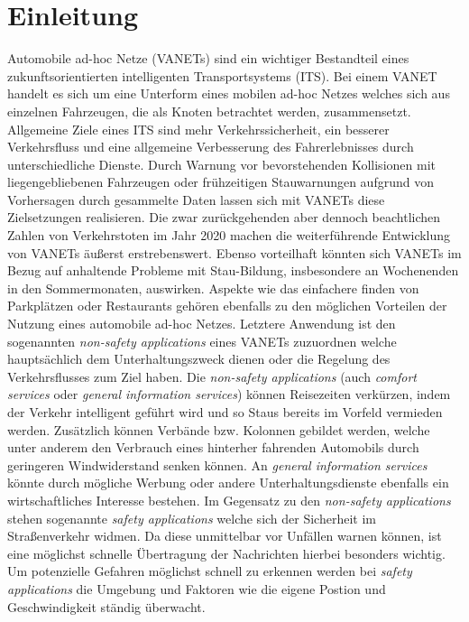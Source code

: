 \documentclass[english,runningheads,a4paper]{llncs}[2018/03/10]
\begin{document}
\section{Einleitung}\label{sec:intro}
Automobile ad-hoc Netze (VANETs) sind ein wichtiger Bestandteil eines zukunftsorientierten intelligenten Transportsystems (ITS). %
Bei einem VANET handelt es sich um eine Unterform eines mobilen ad-hoc Netzes welches sich aus einzelnen Fahrzeugen, die als Knoten betrachtet werden, zusammensetzt.
Allgemeine Ziele eines ITS sind mehr Verkehrssicherheit, ein besserer Verkehrsfluss und eine allgemeine Verbesserung des Fahrerlebnisses durch unterschiedliche Dienste.
Durch Warnung vor bevorstehenden Kollisionen mit liegengebliebenen Fahrzeugen oder frühzeitigen Stauwarnungen aufgrund von Vorhersagen durch gesammelte Daten lassen sich mit VANETs diese Zielsetzungen realisieren.
Die zwar zurückgehenden aber dennoch beachtlichen Zahlen von Verkehrstoten im Jahr 2020\cite{adacVerkehrstote} machen die weiterführende Entwicklung von VANETs äußerst erstrebenswert.
Ebenso vorteilhaft könnten sich VANETs im Bezug auf anhaltende Probleme mit Stau-Bildung, insbesondere an Wochenenden in den Sommermonaten\cite{adacStaus}, auswirken.
Aspekte wie das einfachere finden von Parkplätzen oder Restaurants gehören ebenfalls zu den möglichen Vorteilen der Nutzung eines automobile ad-hoc Netzes.
Letztere Anwendung ist den sogenannten \textit{non-safety applications} eines VANETs zuzuordnen welche hauptsächlich dem Unterhaltungszweck dienen oder die Regelung des Verkehrsflusses zum Ziel haben.
Die \textit{non-safety applications} (auch \textit{comfort services} oder \textit{general information services}) können Reisezeiten verkürzen, indem der Verkehr intelligent geführt wird und so Staus bereits im Vorfeld vermieden werden.
Zusätzlich können Verbände bzw. Kolonnen gebildet werden, welche unter anderem den Verbrauch eines hinterher fahrenden Automobils durch geringeren Windwiderstand senken können.
An \textit{general information services} könnte durch mögliche Werbung oder andere Unterhaltungsdienste ebenfalls ein wirtschaftliches Interesse bestehen.
Im Gegensatz zu den \textit{non-safety applications} stehen sogenannte \textit{safety applications} welche sich der Sicherheit im Straßenverkehr widmen.
Da diese unmittelbar vor Unfällen warnen können, ist eine möglichst schnelle Übertragung der Nachrichten hierbei besonders wichtig.
Um potenzielle Gefahren möglichst schnell zu erkennen werden bei \textit{safety applications} die Umgebung und Faktoren wie die eigene Postion und Geschwindigkeit ständig überwacht.
\end{document}
